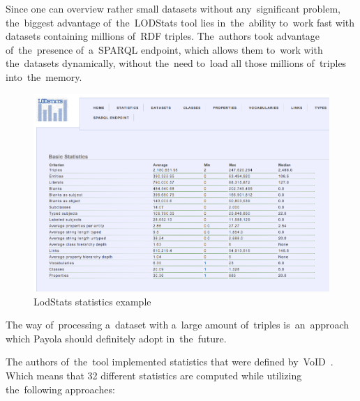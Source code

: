 Since one can overview rather small datasets without any~significant problem, 
the~biggest advantage of~the~LODStats tool lies in~the~ability to~work fast with 
datasets containing millions of~RDF triples. The~authors took advantage 
of~the~presence of~a~SPARQL endpoint, which allows them to~work with the~datasets 
dynamically, without the~need to~load all those millions of~triples into~the~memory.


\begin{figure}
	\centering
	\includegraphics[width=140mm]{img/lodstats.png}
	\caption{LodStats statistics example}
	\label{fig:lodstats}
\end{figure}

The way of~processing a~dataset with a~large amount of~triples is~an~approach 
which Payola should definitely adopt in~the~future.

The authors of~the~tool implemented statistics that were defined by~VoID~\cite{void}. Which 
means that 32 different statistics are computed while utilizing the~following 
approaches:

